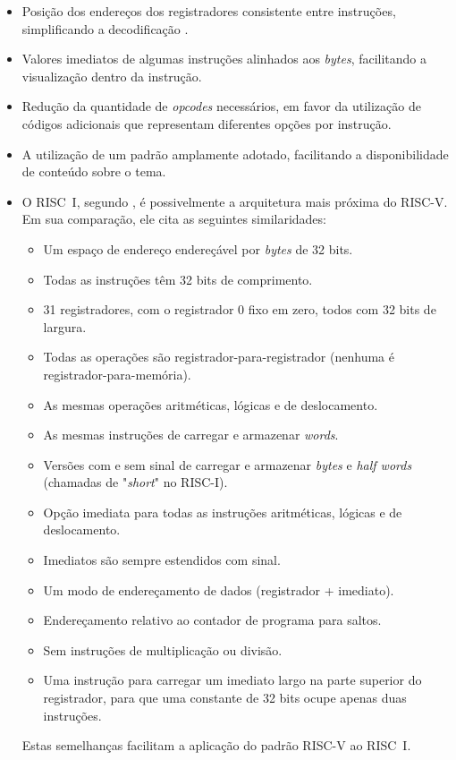 \documentclass[
	12pt,				%
	openright,			%
	oneside,			%
	a4paper,			%
	english,			%
	french,				%
	spanish,			%
	brazil,				%
	]{abntex2}
\begin{document}
\begin{itemize}
    \item Posição dos endereços dos registradores consistente entre instruções, simplificando a decodificação \cite{risc-v_risc-v_2024}.
    \item Valores imediatos de algumas instruções alinhados aos \textit{bytes}, facilitando a visualização dentro da instrução.
    \item Redução da quantidade de \textit{opcodes} necessários, em favor da utilização de códigos adicionais que representam diferentes opções por instrução.
    \item A utilização de um padrão amplamente adotado, facilitando a disponibilidade de conteúdo sobre o tema.
    \item O RISC~I, segundo , é possivelmente a arquitetura mais próxima do RISC-V. Em sua comparação, ele cita as seguintes similaridades:
    \vspace{1.5cm}
    \begin{adjustwidth}{4cm}{0cm}
        \fontsize{10pt}{12pt}\selectfont
        \begin{itemize}
            \item Um espaço de endereço endereçável por \textit{bytes} de 32 bits.
            \item Todas as instruções têm 32 bits de comprimento.
            \item 31 registradores, com o registrador 0 fixo em zero, todos com 32 bits de largura.
            \item Todas as operações são registrador-para-registrador (nenhuma é registrador-para-memória).
            \item As mesmas operações aritméticas, lógicas e de deslocamento.
            \item As mesmas instruções de carregar e armazenar \textit{words}.
            \item Versões com e sem sinal de carregar e armazenar \textit{bytes} e \textit{half words} (chamadas de "\textit{short}" no RISC-I).
            \item Opção imediata para todas as instruções aritméticas, lógicas e de deslocamento.
            \item Imediatos são sempre estendidos com sinal.
            \item Um modo de endereçamento de dados (registrador + imediato).
            \item Endereçamento relativo ao contador de programa para saltos.
            \item Sem instruções de multiplicação ou divisão.
            \item Uma instrução para carregar um imediato largo na parte superior do registrador, para que uma constante de 32 bits ocupe apenas duas instruções.
        \end{itemize}
    \end{adjustwidth}
    Estas semelhanças facilitam a aplicação do padrão RISC-V ao RISC~I.
\end{itemize}
\end{document}
